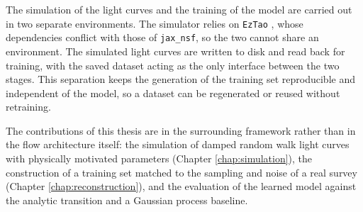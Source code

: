 The simulation of the light curves and the training of the model are carried out in two separate environments. The simulator relies on \texttt{EzTao} \parencite{Yu2022Extao}, whose dependencies conflict with those of \texttt{jax\_nsf}, so the two cannot share an environment. The simulated light curves are written to disk and read back for training, with the saved dataset acting as the only interface between the two stages. This separation keeps the generation of the training set reproducible and independent of the model, so a dataset can be regenerated or reused without retraining.

The contributions of this thesis are in the surrounding framework rather than in the flow architecture itself: the simulation of damped random walk light curves with physically motivated parameters (Chapter \ref{chap:simulation}), the construction of a training set matched to the sampling and noise of a real survey (Chapter \ref{chap:reconstruction}), and the evaluation of the learned model against the analytic transition and a Gaussian process baseline.%